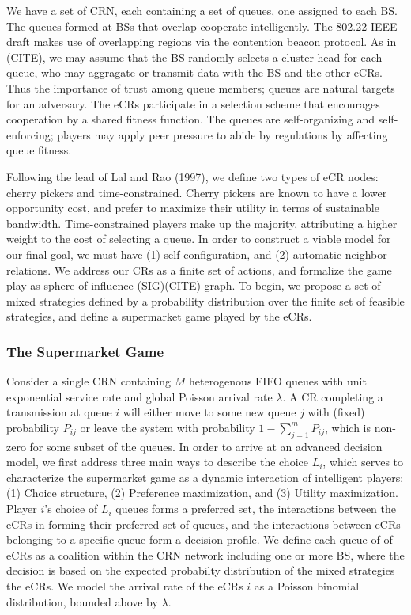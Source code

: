 \documentclass[10pt]{article}
\theoremstyle{definition}
\begin{document}
We have a set of CRN, each containing a set of queues, one assigned to each BS. 
The queues formed at BSs that overlap cooperate intelligently. 
The 802.22 IEEE draft makes use of overlapping regions via the
contention beacon protocol. As in (CITE), we may assume that the BS randomly
selects a cluster head for each queue, who may aggragate or transmit data with
the BS and the other eCRs. Thus the importance of trust among queue members;
queues are natural targets for an adversary. 
The eCRs participate in a selection scheme that
encourages cooperation by a shared fitness function. The queues
are self-organizing and
self-enforcing; players may apply peer
pressure to abide by regulations by affecting queue fitness.

Following the lead of Lal
and Rao (1997), we define two types of eCR nodes: cherry pickers and
time-constrained. Cherry pickers are known to have a lower opportunity cost, and
prefer to maximize their utility in terms of sustainable bandwidth. 
Time-constrained players make up the majority, attributing a higher weight to
the cost of selecting a queue. 
In order to construct a viable model for our 
final goal, we must have (1) self-configuration, and (2) automatic neighbor relations. 
We address our CRs as a finite set of
actions, and formalize the game play as sphere-of-influence (SIG)(CITE) graph.
To begin, we propose a set of mixed
strategies defined by a probability distribution over
the finite set of feasible strategies, and define a 
supermarket game played by the eCRs.

\subsubsection{The Supermarket Game}

Consider a single CRN containing $M$ heterogenous FIFO queues with unit exponential service rate and global
Poisson arrival rate $\lambda$. A CR completing a transmission at queue $i$ will either 
move to some new queue $j$ with (fixed) probability $P_{ij}$ or leave the system 
with probability $\displaystyle 1-\sum _{j=1}^{m}P_{ij}$, which is non-zero for some subset of the queues. 
In order to arrive at an advanced decision model, we first address three main ways to describe the choice $L_i$, which serves to characterize the
supermarket game as a dynamic interaction of intelligent players: (1) Choice structure,
(2) Preference maximization, and (3) Utility maximization.
Player $i$'s choice of $L_i$ queues forms a preferred set, the interactions between the eCRs in forming their
preferred set of queues, and the interactions between eCRs belonging to a specific
queue form a decision profile. We define each queue of of eCRs as a coalition
within the CRN network including one or more BS, where the decision is based on
the expected probabilty distribution of the mixed strategies the eCRs.
We model the arrival rate of the eCRs $i$ as a 
Poisson binomial distribution, bounded above by $\lambda$.
\end{document}
